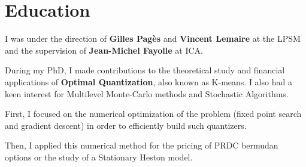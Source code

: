 \documentclass[]{deedy-resume-openfont}
\begin{document}
\sectionsep
\sectionsep


\sectionsep


\section{Education}
\sectionsep

I was under the direction of \textbf{Gilles Pagès} and \textbf{Vincent Lemaire} at the LPSM and the supervision of \textbf{Jean-Michel Fayolle} at ICA.

\vspace{0.2cm}
During my PhD, I made contributions to the theoretical study and financial applications of \textbf{Optimal Quantization}, also known as K-means. I also had a keen interest for Multilevel Monte-Carlo methods and Stochastic Algorithms.
\vspace{0.1cm}
\begin{tightemize}
	\item[\diamond] First, I focused on the numerical optimization of the problem (fixed point search and gradient descent) in order to efficiently build such quantizers.
	\item[\diamond] Then, I applied this numerical method for the pricing of PRDC bermudan options or the study of a Stationary Heston model.
\end{tightemize}

\sectionsep
\sectionsep

\end{document}
